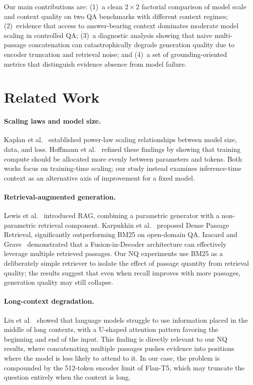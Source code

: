 \documentclass[a4paper,12pt]{article}
\begin{document}
Our main contributions are: (1)~a clean $2 \times 2$ factorial comparison of model scale and context quality on two QA benchmarks with different context regimes; (2)~evidence that access to answer-bearing context dominates moderate model scaling in controlled QA; (3)~a diagnostic analysis showing that naive multi-passage concatenation can catastrophically degrade generation quality due to encoder truncation and retrieval noise; and (4)~a set of grounding-oriented metrics that distinguish evidence absence from model failure.

\section{Related Work}

\paragraph{Scaling laws and model size.}
Kaplan et al.~\cite{scaling} established power-law scaling relationships between model size, data, and loss. Hoffmann et al.~\cite{chinchilla} refined these findings by showing that training compute should be allocated more evenly between parameters and tokens. Both works focus on training-time scaling; our study instead examines inference-time context as an alternative axis of improvement for a fixed model.

\paragraph{Retrieval-augmented generation.}
Lewis et al.~\cite{rag} introduced RAG, combining a parametric generator with a non-parametric retrieval component. Karpukhin et al.~\cite{dpr} proposed Dense Passage Retrieval, significantly outperforming BM25 on open-domain QA. Izacard and Grave~\cite{izacard} demonstrated that a Fusion-in-Decoder architecture can effectively leverage multiple retrieved passages. Our NQ experiments use BM25 as a deliberately simple retriever to isolate the effect of passage quantity from retrieval quality; the results suggest that even when recall improves with more passages, generation quality may still collapse.

\paragraph{Long-context degradation.}
Liu et al.~\cite{lost} showed that language models struggle to use information placed in the middle of long contexts, with a U-shaped attention pattern favoring the beginning and end of the input. This finding is directly relevant to our NQ results, where concatenating multiple passages pushes evidence into positions where the model is less likely to attend to it. In our case, the problem is compounded by the 512-token encoder limit of Flan-T5, which may truncate the question entirely when the context is long.
\end{document}
